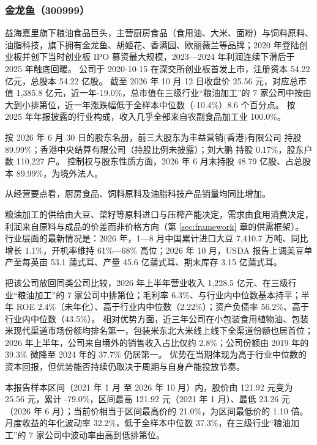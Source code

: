 
\subsubsection{金龙鱼（300999）}
\label{co:300999}

 益海嘉里旗下粮油食品巨头，主营厨房食品（食用油、大米、面粉）与饲料原料、油脂科技，旗下拥有金龙鱼、胡姬花、香满园、欧丽薇兰等品牌；2020 年登陆创业板并创下当时创业板 IPO 募资最大规模，2023—2024 年利润连续下滑后于 2025 年触底回暖。 公司于 2020-10-15 在深交所创业板首发上市，注册资本 54.22 亿元，总股本 54.22 亿股。 截至 2026 年 10 月 12 日收盘价 25.56 元，对应总市值 1,385.8 亿元，近一年-19.0\%，总市值在三级行业“粮油加工”的 7 家公司中按由大到小排第位，近一年涨跌幅低于全样本中位数（-10.4\%）8.6 个百分点。 按 2025 年年报披露的行业构成，收入几乎全部来自农副食品加工业 100.0\%。

 按 2026 年 6 月 30 日的股东名册，前三大股东为丰益营销(香港)有限公司 持股 89.99\%；香港中央结算有限公司（持股比例未披露）；刘大鹏 持股 0.17\%，股东户数 110,227 户。 控制权与股东性质方面，2026 年 6 月末持股 48.79 亿股、占总股本 89.99\%，为境外法人。

 从经营要点看，厨房食品、饲料原料及油脂科技产品销量均同比增加。

 粮油加工的供给由大豆、菜籽等原料进口与压榨产能决定，需求由食用消费决定，利润来自原料与成品的价差而非价格方向（第 \ref{sec:framework} 章的供需框架）。 行业层面的最新情况是：2026 年，1—8 月中国累计进口大豆 7,410.7 万吨、同比增长 1.1\%，开机率维持 61\%—68\% 高位；2026 年 10 月，USDA 报告上调美豆单产至每英亩 53.1 蒲式耳、产量 45.6 亿蒲式耳、期末库存 3.15 亿蒲式耳。

 把该公司放回同类公司比较，2026 年上半年营业收入 1,228.5 亿元、在三级行业“粮油加工”的 7 家公司中排第位；毛利率 6.3\%、与行业内中位数基本持平；半年 ROE 2.4\%（未年化）、高于行业内中位数（2.22\%）；资产负债率 56.2\%、高于行业内中位数（43.5\%）。 相对优势方面，近三年公司在小包装食用植物油、包装米现代渠道市场份额均排名第一，包装米东北大米线上线下全渠道份额也居首位；2026 年上半年，公司来自境外的销售收入占比仅约 2.8\%；公司份额由 2019 年的 39.3\% 微降至 2024 年的 37.7\% 仍居第一。 优势在当期体现为高于行业中位数的资本回报，但优势能否持续仍取决于周期与自身产能投放节奏。

 本报告样本区间（2021 年 1 月 至 2026 年 10 月）内，股价由 121.92 元变为 25.56 元，累计 -79.0\%，区间最高 121.92 元（2021 年 1 月）、最低 23.26 元（2026 年 6 月）；当前价相当于区间最高价的 21.0\%，为区间最低价的 1.10 倍。 月度收益的年化波动率 32.2\%，低于全样本中位数 37.3\%，在三级行业“粮油加工”的 7 家公司中波动率由高到低排第位。

